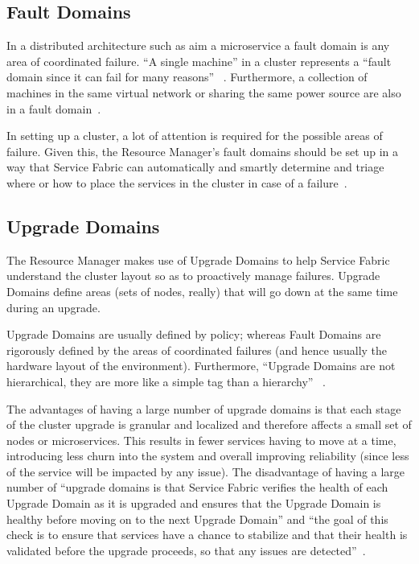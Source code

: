 \subsection{Fault Domains}
In a distributed architecture such as aim a microservice a fault
domain is any area of coordinated failure. ``A single machine'' in a cluster
represents a ``fault domain since it can fail for many reasons''
~\cite{hid-sp18-501-description}. 
Furthermore, a collection of
machines in the same virtual network or sharing the same power source
are also in a fault domain~\cite{hid-sp18-501-description}.

In setting up a cluster, a lot of attention is required for the
possible areas of failure. Given this, the Resource Manager's fault 
domains should be set
up in a way that Service Fabric can automatically and smartly determine and
triage where or how to place the services in the cluster in case of a
failure~\cite{hid-sp18-501-fig2and3}.

\subsection{Upgrade Domains}
The Resource Manager makes use of Upgrade Domains to help Service Fabric
understand the cluster layout so as to proactively manage failures. 
Upgrade Domains define areas (sets of
nodes, really) that will go down at the same time during an upgrade.

Upgrade Domains are usually defined by policy;
whereas Fault Domains are rigorously defined by the areas of
coordinated failures (and hence usually the hardware layout of the
environment). Furthermore, ``Upgrade Domains are not
hierarchical, they are more like a simple tag than a hierarchy''
~\cite{hid-sp18-501-fig2and3}.

The advantages of having a large number of upgrade domains is that
each stage of the cluster upgrade is granular and localized and
therefore affects a small set of nodes or microservices. This results
in fewer services having to move at a time, introducing less churn
into the system and overall improving reliability (since less of the
service will be impacted by any issue).  The disadvantage of having a
large number of ``upgrade domains is that Service Fabric verifies the
health of each Upgrade Domain as it is upgraded and ensures that the
Upgrade Domain is healthy before moving on to the next Upgrade
Domain'' and ``the goal of this check is to
ensure that services have a chance to stabilize and that their health
is validated before the upgrade proceeds, so that any issues are
detected''~\cite{hid-sp18-501-fig2and3}.  

